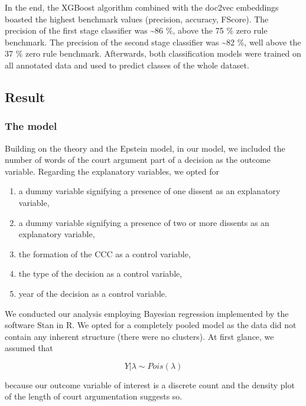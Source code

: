 \documentclass[
  11pt,
]{article}
\providecommand{\tightlist}{%
  \setlength{\itemsep}{0pt}\setlength{\parskip}{0pt}}
\begin{document}
In the end, the XGBoost algorithm combined with the doc2vec embeddings
boasted the highest benchmark values (precision, accuracy, FScore). The
precision of the first stage classifier was \textasciitilde86 \%, above
the 75 \% zero rule benchmark. The precision of the second stage
classifier was \textasciitilde82 \%, well above the 37 \% zero rule
benchmark. Afterwards, both classification models were trained on all
annotated data and used to predict classes of the whole dataset.

\hypertarget{result}{%
\subsection{Result}\label{result}}

\hypertarget{the-model}{%
\subsubsection{The model}\label{the-model}}

Building on the theory and the Epstein model, in our model, we included
the number of words of the court argument part of a decision as the
outcome variable. Regarding the explanatory variables, we opted for

\begin{enumerate}
\def\labelenumi{(\arabic{enumi})}
\tightlist
\item
  a dummy variable signifying a presence of one dissent as an
  explanatory variable,
\item
  a dummy variable signifying a presence of two or more dissents as an
  explanatory variable,
\item
  the formation of the CCC as a control variable,
\item
  the type of the decision as a control variable,\\
\item
  year of the decision as a control variable.
\end{enumerate}

We conducted our analysis employing Bayesian regression implemented by
the software Stan in R. We opted for a completely pooled model as the
data did not contain any inherent structure (there were no clusters). At
first glance, we assumed that

\[
Y | \lambda \sim Pois(\lambda)
\]

because our outcome variable of interest is a discrete count and the
density plot of the length of court argumentation suggests so.
\end{document}
